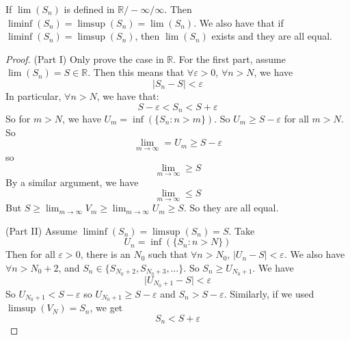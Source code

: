 \documentclass{report}
\begin{document}
\begin{theorem}{10.7}
    If $\lim (S_{n})$ is defined in $\mathbb{R}/-\infty/\infty$. Then $\liminf (S_{n}) = \limsup (S_{n}) = \lim (S_{n})$. We also have that if $\liminf (S_{n}) = \limsup (S_{n})$, then $\lim (S_{n})$ exists and they are all equal.
\end{theorem}
    \begin{proof}
        (Part I) Only prove the case in $\mathbb{R}$. For the first part, assume $\lim (S_{n}) = S \in \mathbb{R}$. Then this means that $\forall \varepsilon >  0$, $\forall n > N$, we have
            \begin{equation*}
                \lvert S_{n} - S \rvert < \varepsilon
            \end{equation*}
        In particular, $\forall n > N$, we have that:
            \begin{equation*}
                S - \varepsilon < S_{n} < S + \varepsilon
            \end{equation*}
        So for $m > N$, we have $U_{m} = \inf (\{S_{n} : n > m\})$. So $U_{m} \geq S - \varepsilon$ for all $m > N$. So
            \begin{equation*}
                \lim _{m \rightarrow \infty} = U_{m} \geq S - \varepsilon
            \end{equation*}
        so 
            \begin{equation*}
                \lim _{m \rightarrow \infty} \geq S
            \end{equation*}
        By a similar argument, we have
            \begin{equation*}
                \lim _{m \rightarrow \infty} \leq S
            \end{equation*}
        But $S \geq  \lim _{m \rightarrow \infty} V_{m} \geq \lim _{m \rightarrow \infty}U_{m} \geq S$. So they are all equal.

        (Part II) Assume $\liminf (S_{n}) = \limsup (S_{n}) = S$. Take 
            \begin{equation*}
                U_{n} = \inf (\{S_{n} : n > N\})
            \end{equation*}
        Then for all $\varepsilon > 0$, there is an $N_{0}$ such that $\forall n > N_{0}$, $\lvert U_{n} - S \rvert < \varepsilon$. We also have $\forall n > N_{0} + 2$, and $S_{n} \in \{S_{N_{0} + 2}, S_{N_{0} + 3}, \ldots\}$. So $S_{n} \geq U_{N_{0} + 1}$. We have
            \begin{equation*}
                \lvert U_{N_{0} + 1} - S \rvert <  \varepsilon
            \end{equation*}
        So $U_{N_{0} + 1} < S - \varepsilon$ so $U_{N_{0} + 1} \geq S - \varepsilon$ and $S_{n} > S - \varepsilon$. Similarly, if we used $\limsup (V_{N}) = S_{n}$, we get
            \begin{equation*}
                S_{n} < S + \varepsilon
            \end{equation*}
    \end{proof}
\end{document}
